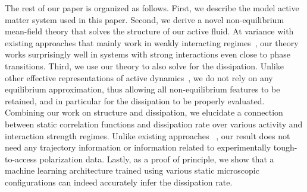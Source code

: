 \documentclass[superscriptaddress, twocolumn, prl, longbibliography, nofootinbib]{revtex4-1}
\begin{document}
The rest of our paper is organized as follows. First, we describe the model active matter system used in this paper.  Second, we derive a novel non-equilibrium mean-field theory that solves the structure of our active fluid. At variance with existing approaches that mainly work in weakly interacting regimes~\cite{Dean_1996}, our theory works surprisingly well in systems with strong interactions even close to phase transitions. Third, we use our theory to also solve for the dissipation. Unlike other effective representations of active dynamics~\cite{Maggi2015, Rein2016, Wittmann2017}, we do not rely on any equilibrium approximation, thus allowing all non-equilibrium features to be retained, and in particular for the dissipation to be properly evaluated. Combining our work on structure and dissipation, we elucidate a connection between static correlation functions and dissipation rate over various activity and interaction strength regimes. Unlike existing approaches ~\cite{Sasa2005, Toyabe2010, Ahmed2016, Nardini2017, Mizuno2018, Barato2015, Gingrich2016, Gladrow2016, Li2019, Roldan2018, Parrondo2019}, our result does not need any trajectory information or information related to experimentally tough-to-access polarization data. Lastly, as a proof of principle, we show that a machine learning architecture trained using various static microscopic configurations can indeed accurately infer the dissipation rate.




\end{document}
